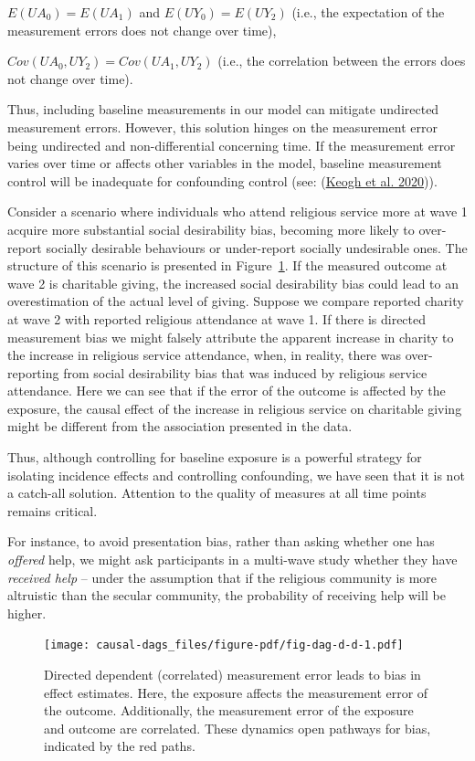 \documentclass[
  singlecolumn]{article}
\begin{document}
\(E(UA_0) = E(UA_1)\) and \(E(UY_0) = E(UY_2)\) (i.e., the expectation
of the measurement errors does not change over time),

\(Cov(UA_0, UY_2) = Cov(UA_1, UY_2)\) (i.e., the correlation between the
errors does not change over time).

Thus, including baseline measurements in our model can mitigate
undirected measurement errors. However, this solution hinges on the
measurement error being undirected and non-differential concerning time.
If the measurement error varies over time or affects other variables in
the model, baseline measurement control will be inadequate for
confounding control (see: (\protect\hyperlink{ref-keogh2020}{Keogh et
al. 2020})).

Consider a scenario where individuals who attend religious service more
at wave 1 acquire more substantial social desirability bias, becoming
more likely to over-report socially desirable behaviours or under-report
socially undesirable ones. The structure of this scenario is presented
in Figure~\ref{fig-dag-d-d}. If the measured outcome at wave 2 is
charitable giving, the increased social desirability bias could lead to
an overestimation of the actual level of giving. Suppose we compare
reported charity at wave 2 with reported religious attendance at wave 1.
If there is directed measurement bias we might falsely attribute the
apparent increase in charity to the increase in religious service
attendance, when, in reality, there was over-reporting from social
desirability bias that was induced by religious service attendance. Here
we can see that if the error of the outcome is affected by the exposure,
the causal effect of the increase in religious service on charitable
giving might be different from the association presented in the data.

Thus, although controlling for baseline exposure is a powerful strategy
for isolating incidence effects and controlling confounding, we have
seen that it is not a catch-all solution. Attention to the quality of
measures at all time points remains critical.

For instance, to avoid presentation bias, rather than asking whether one
has \emph{offered} help, we might ask participants in a multi-wave study
whether they have \emph{received help} -- under the assumption that if
the religious community is more altruistic than the secular community,
the probability of receiving help will be higher.

\begin{figure}

{\centering \texttt{[image: causal-dags\_files/figure-pdf/fig-dag-d-d-1.pdf]}

}

\caption{\label{fig-dag-d-d}Directed dependent (correlated) measurement
error leads to bias in effect estimates. Here, the exposure affects the
measurement error of the outcome. Additionally, the measurement error of
the exposure and outcome are correlated. These dynamics open pathways
for bias, indicated by the red paths.}

\end{figure}
\end{document}
